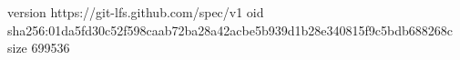 version https://git-lfs.github.com/spec/v1
oid sha256:01da5fd30c52f598caab72ba28a42acbe5b939d1b28e340815f9c5bdb688268c
size 699536
